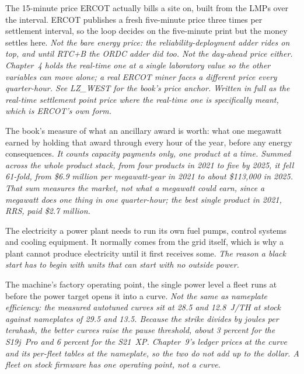 \begin{description}[leftmargin=0pt,style=unboxed,itemsep=0.35em,parsep=0.15em]
\item[settlement point price] \hypertarget{glossary:settlement-point-price}{}The 15-minute price ERCOT actually bills a site on, built from the LMPs over the interval. ERCOT publishes a fresh five-minute price three times per settlement interval, so the loop decides on the five-minute print but the money settles here. \emph{Not the bare energy price: the reliability-deployment adder rides on top, and until RTC+B the ORDC adder did too. Not the day-ahead price either. Chapter~4 holds the real-time one at a single laboratory value so the other variables can move alone; a real ERCOT miner faces a different price every quarter-hour. See LZ\_WEST for the book's price anchor. Written in full as the real-time settlement point price where the real-time one is specifically meant, which is ERCOT's own form.}
\item[standing revenue] \hypertarget{glossary:standing-revenue}{}The book's measure of what an ancillary award is worth: what one megawatt earned by holding that award through every hour of the year, before any energy consequences. \emph{It counts capacity payments only, one product at a time. Summed across the whole product stack, from four products in 2021 to five by 2025, it fell 61-fold, from \$6.9 million per megawatt-year in 2021 to about \$113,000 in 2025. That sum measures the market, not what a megawatt could earn, since a megawatt does one thing in one quarter-hour; the best single product in 2021, RRS, paid \$2.7 million.}
\item[station power] \hypertarget{glossary:station-power}{}The electricity a power plant needs to run its own fuel pumps, control systems and cooling equipment. It normally comes from the grid itself, which is why a plant cannot produce electricity until it first receives some. \emph{The reason a black start has to begin with units that can start with no outside power.}
\item[stock power] \hypertarget{glossary:stock-power}{}The machine's factory operating point, the single power level a fleet runs at before the power target opens it into a curve. \emph{Not the same as nameplate efficiency: the measured autotuned curves sit at 28.5 and 12.8~J/TH at stock against nameplates of 29.5 and 13.5. Because the strike divides by joules per terahash, the better curves raise the pause threshold, about 3 percent for the S19j~Pro and 6 percent for the S21~XP. Chapter~9's ledger prices at the curve and its per-fleet tables at the nameplate, so the two do not add up to the dollar. A fleet on stock firmware has one operating point, not a curve.}

\end{description}
